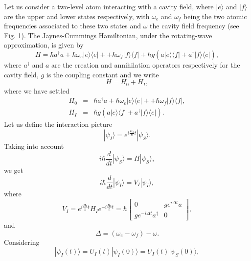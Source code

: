 \documentclass[12pt,thmsa]{article}
\begin{document}
Let us consider a two-level atom interacting with a cavity field, where $%
|e\rangle $ and $|f\rangle $ are the upper and lower states respectively,
with $\omega _{e}$ and $\omega _{f}$ being the two atomic frequencies
associated to these two states and $\omega $ the cavity field frequency (see
Fig. 1). The Jaynes-Cummings Hamiltonian, under the rotating-wave
approximation, is given by \cite{JCM, Orszag, WallsMilburn}%
\begin{equation}
H=\hbar a^{\dag }a+\hbar \omega _{e}|e\rangle \langle e|++\hbar \omega
_{f}|f\rangle \langle f|+\hbar g(a|e\rangle \langle f|+a^{\dag }|f\rangle
\langle e|),  \label{JCH}
\end{equation}%
where $a^{\dag }$ and $a$ are the creation and annihilation operators
respectively for the cavity field, $g$ is the coupling constant and we write%
\begin{equation}
H=H_{0}+H_{I},
\end{equation}%
where we have settled%
\begin{eqnarray}
H_{0} &=&\hbar a^{\dag }a+\hbar \omega _{e}|e\rangle \langle e|++\hbar
\omega _{f}|f\rangle \langle f|,  \nonumber \\
H_{I} &=&\hbar g(a|e\rangle \langle f|+a^{\dag }|f\rangle \langle e|).
\end{eqnarray}%
Let us define the interaction picture%
\begin{equation}
|\psi _{I}\rangle =e^{i\frac{H_{0}}{\hbar }t}|\psi _{S}\rangle .
\end{equation}%
Taking into account%
\begin{equation}
i\hbar \frac{d}{dt}|\psi _{S}\rangle =H|\psi _{S}\rangle ,
\end{equation}%
we get%
\begin{equation}
i\hbar \frac{d}{dt}|\psi _{I}\rangle =V_{I}|\psi _{I}\rangle ,
\end{equation}%
where%
\begin{equation}
V_{I}=e^{i\frac{H_{0}}{\hbar }t}H_{I}e^{-i\frac{H_{0}}{\hbar }t}=\hbar \left[
\begin{array}{cc}
0 & ge^{i\Delta t}a \\ 
ge^{-i\Delta t}a^{\dagger } & 0%
\end{array}%
\right] ,
\end{equation}%
and%
\begin{equation}
\Delta =(\omega _{e}-\omega _{f})-\omega .
\end{equation}%
Considering%
\begin{equation}
|\psi _{I}(t)\rangle =U_{I}(t)|\psi _{I}(0)\rangle =U_{I}(t)|\psi
_{S}(0)\rangle ,
\end{equation}%
\end{document}
